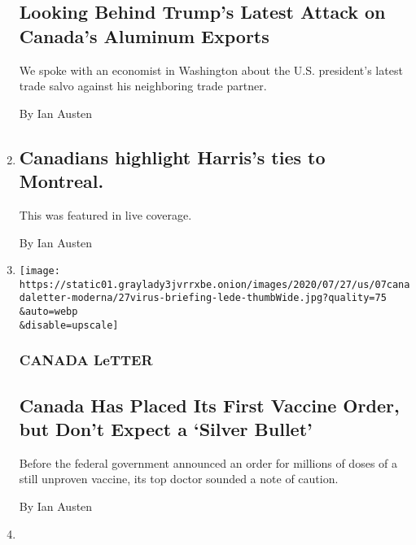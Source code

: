 \begin{enumerate}
  \hypertarget{looking-behind-trumps-latest-attack-on-canadas-aluminum-exports}{%
  \subsection{Looking Behind Trump's Latest Attack on Canada's Aluminum
  Exports}\label{looking-behind-trumps-latest-attack-on-canadas-aluminum-exports}}

  We spoke with an economist in Washington about the U.S. president's
  latest trade salvo against his neighboring trade partner.

  By Ian Austen
\item
  \href{/live/2020/08/11/us/biden-vs-trump/canadians-highlight-harriss-ties-to-montreal}{}

  \hypertarget{canadians-highlight-harriss-ties-to-montreal}{%
  \subsection{Canadians highlight Harris's ties to
  Montreal.}\label{canadians-highlight-harriss-ties-to-montreal}}

  This was featured in live coverage.

  By Ian Austen
\item
  \href{/2020/08/07/world/canada/canada-letter-vaccine.html}{}

  \texttt{[image: https://static01.graylady3jvrrxbe.onion/images/2020/07/27/us/07canadaletter-moderna/27virus-briefing-lede-thumbWide.jpg?quality=75\\\&auto=webp\\\&disable=upscale]}

  \hypertarget{canada-letter-1}{%
  \subsubsection{CANADA LeTTER}\label{canada-letter-1}}

  \hypertarget{canada-has-placed-its-first-vaccine-order-but-dont-expect-a-silver-bullet}{%
  \subsection{Canada Has Placed Its First Vaccine Order, but Don't
  Expect a `Silver
  Bullet'}\label{canada-has-placed-its-first-vaccine-order-but-dont-expect-a-silver-bullet}}

  Before the federal government announced an order for millions of doses
  of a still unproven vaccine, its top doctor sounded a note of caution.

  By Ian Austen
\item
  \href{/2020/08/06/business/economy/trump-canadian-aluminum-tariffs.html}{}


\end{enumerate}
